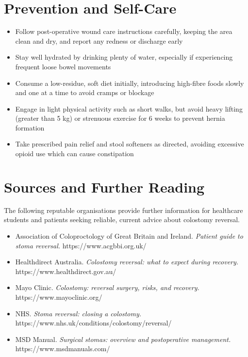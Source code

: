 \section*{Prevention and Self-Care}
\begin{itemize}
    \item Follow post-operative wound care instructions carefully, keeping the area clean and dry, and report any redness or discharge early
    \item Stay well hydrated by drinking plenty of water, especially if experiencing frequent loose bowel movements
    \item Consume a low-residue, soft diet initially, introducing high-fibre foods slowly and one at a time to avoid cramps or blockage
    \item Engage in light physical activity such as short walks, but avoid heavy lifting (greater than 5 kg) or strenuous exercise for 6 weeks to prevent hernia formation
    \item Take prescribed pain relief and stool softeners as directed, avoiding excessive opioid use which can cause constipation
\end{itemize}

\section*{Sources and Further Reading}
The following reputable organisations provide further information for healthcare students and patients seeking reliable, current advice about colostomy reversal.

\begin{itemize}
    \item Association of Coloproctology of Great Britain and Ireland. \textit{Patient guide to stoma reversal.} https://www.acgbbi.org.uk/
    \item Healthdirect Australia. \textit{Colostomy reversal: what to expect during recovery.} https://www.healthdirect.gov.au/
    \item Mayo Clinic. \textit{Colostomy: reversal surgery, risks, and recovery.} https://www.mayoclinic.org/
    \item NHS. \textit{Stoma reversal: closing a colostomy.} https://www.nhs.uk/conditions/colostomy/reversal/
    \item MSD Manual. \textit{Surgical stomas: overview and postoperative management.} https://www.msdmanuals.com/
\end{itemize}
